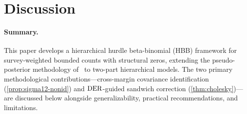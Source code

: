 
\section{Discussion}\label{sec:discussion}


\paragraph{Summary.}
This paper develops a hierarchical hurdle beta-binomial (HBB) framework
for survey-weighted bounded counts with structural zeros, extending the
pseudo-posterior methodology of~\citet{WilliamsSavitsky2021} to two-part
hierarchical models.  The two primary methodological
contributions---cross-margin covariance identification
(\cref{prop:sigma12-nonid}) and $\operatorname{DER}$-guided sandwich correction
(\cref{thm:cholesky})---are discussed below alongside generalizability,
practical recommendations, and limitations.


